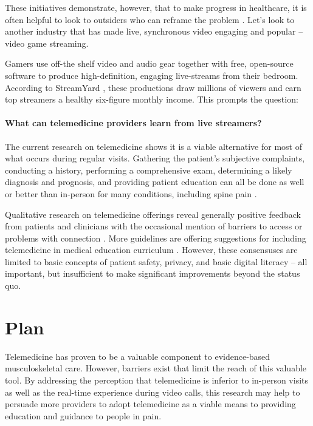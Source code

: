 \documentclass[utf8]{FrontiersinHarvard} %
\begin{document}
These initiatives demonstrate, however, that to make progress in healthcare, it is often helpful to look to outsiders who can reframe the problem \citep{khoslaventuresWinningOutsiderBuilding2023, staeritzHowCanHealthcare2021}. Let's look to another industry that has made live, synchronous video engaging and popular -- video game streaming.

Gamers use off-the shelf video and audio gear together with free, open-source software to produce high-definition, engaging live-streams from their bedroom. According to StreamYard \citep{HowMuchMoney2023}, these productions draw millions of viewers and earn top streamers a healthy six-figure monthly income. This prompts the question:

\paragraph{\textbf{What can telemedicine providers learn from live streamers?}}

The current research on telemedicine shows it is a viable alternative for most of what occurs during regular visits. Gathering the patient's subjective complaints, conducting a history, performing a comprehensive exam, determining a likely diagnosis and prognosis, and providing patient education can all be done as well or better than in-person for many conditions, including spine pain \citep{ansaryVirtualPhysicalExam2021, satinVirtualSpineExamination2021}.

Qualitative research on telemedicine offerings reveal generally positive feedback from patients and clinicians with the occasional mention of barriers to access or problems with connection \citep{ahmadPatientPerspectivesTelemedicine2023, hinmanSoundsBitCrazy2017}. More guidelines are offering suggestions for including telemedicine in medical education curriculum \citep{daviesInternationalCoreCapability2021}. However, these consensuses are limited to basic concepts of patient safety, privacy, and basic digital literacy -- all important, but insufficient to make significant improvements beyond the status quo.

\section{Plan}

Telemedicine has proven to be a valuable component to evidence-based musculoskeletal care. However, barriers exist that limit the reach of this valuable tool. By addressing the perception that telemedicine is inferior to in-person visits as well as the real-time experience during video calls, this research may help to persuade more providers to adopt telemedicine as a viable means to providing education and guidance to people in pain.
\end{document}
